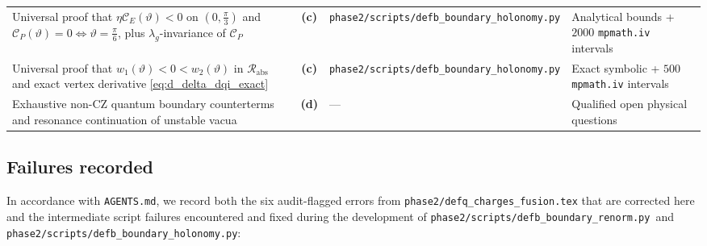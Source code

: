 \documentclass[11pt,a4paper]{article}
\theoremstyle{remark}
\newcommand{\Lc}{\textbf{(c)}}
\newcommand{\Ld}{\textbf{(d)}}
\newcommand{\sren}{\texttt{phase2/\allowbreak scripts/\allowbreak defb\_\allowbreak boundary\_\allowbreak renorm.py}}
\newcommand{\shol}{\texttt{phase2/\allowbreak scripts/\allowbreak defb\_\allowbreak boundary\_\allowbreak holonomy.py}}
\begin{document}
\begin{longtable}{@{}L{5.6cm}cL{3.8cm}L{4.8cm}@{}}
Universal proof that $\eta\mathcal{C}_E(\vartheta)<0$ on $(0,\frac{\pi}{3})$ and $\mathcal{C}_P(\vartheta)=0 \iff \vartheta=\frac{\pi}{6}$, plus $\lambda_g$-invariance of $\mathcal{C}_P$ & \Lc & \shol & Analytical bounds + $2000$ \texttt{mpmath.iv} intervals \\
Universal proof that $w_1(\vartheta)<0<w_2(\vartheta)$ in $\mathcal{R}_{\mathrm{abs}}$ and exact vertex derivative \eqref{eq:d_delta_dqi_exact} & \Lc & \shol & Exact symbolic + $500$ \texttt{mpmath.iv} intervals \\
Exhaustive non-CZ quantum boundary counterterms and resonance continuation of unstable vacua & \Ld & --- & Qualified open physical questions \\\bottomrule
\end{longtable}

\subsection{Failures recorded}

In accordance with \texttt{AGENTS.md}, we record both the six audit-flagged
errors from \texttt{phase2/defq\_charges\_fusion.tex} that are corrected here
and the intermediate script failures encountered and fixed during the
development of \sren\ and \shol:
\end{document}
